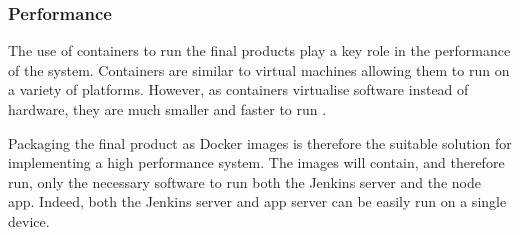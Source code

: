   \subsubsection{Performance}
  The use of containers to run the final products play a key role in the performance of the system. Containers are similar to virtual machines allowing them to run on a variety of platforms. However, as containers virtualise software instead of hardware, they are much smaller and faster to run \citep{docker}.
  
  Packaging the final product as Docker images is therefore the suitable solution for implementing a high performance system. The images will contain, and therefore run, only the necessary software to run both the Jenkins server and the node app. Indeed, both the Jenkins server and app server can be easily run on a single device.
  